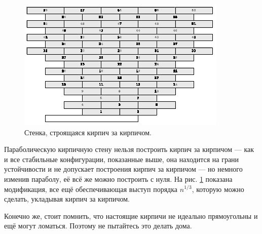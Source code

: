 \begin{figure}[htb!]
\centering
\includegraphics[scale=1]{pics/kirpich9}
\caption{Стенка, строящаяся кирпич за кирпичом.}
\label{pic:kirpich9}
\end{figure}

Параболическую кирпичную стену нельзя построить кирпич за кирпичом — как и все стабильные конфигурации, показанные выше, она находится на грани устойчивости и не допускает построения кирпич за кирпичом — но немного изменив параболу, её всё же можно построить с нуля.
На рис. \ref{pic:kirpich9} показана модификация, все ещё обеспечивающая выступ порядка $n^{1/3}$, которую можно сделать, укладывая кирпич за кирпичом.

Конечно же, стоит помнить, что настоящие кирпичи не идеально прямоугольны и ещё могут ломаться.
Поэтому не пытайтесь это делать дома.
